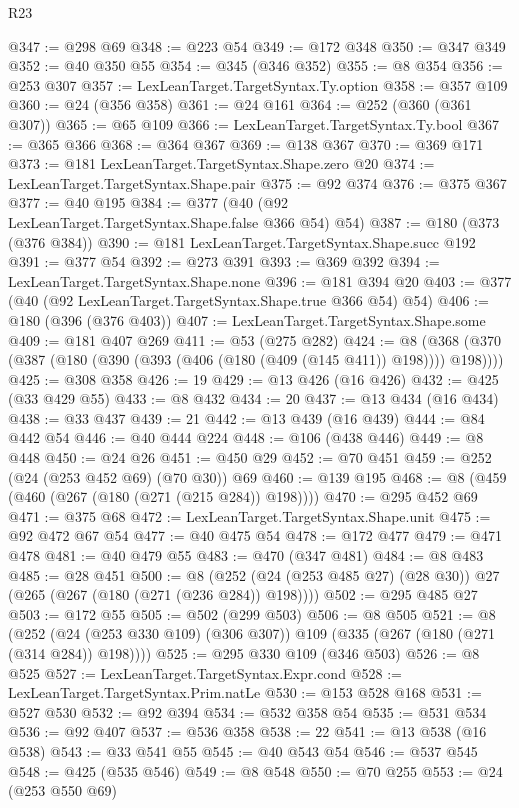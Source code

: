 \begin{lexlean}{R23}
\begin{coremodule}
{{{{{{{{{{{{{{{{{{{{{{{{{{{{{{{{{{{{{{{{{{{{{{{@347 := @298 @69
@348 := @223 @54
@349 := @172 @348
@350 := @347 @349
@352 := @40 @350 @55
@354 := @345 (@346 @352)
@355 := @8 @354
@356 := @253 @307
@357 := LexLeanTarget.TargetSyntax.Ty.option
@358 := @357 @109
@360 := @24 (@356 @358)
@361 := @24 @161
@364 := @252 (@360 (@361 @307))
@365 := @65 @109
@366 := LexLeanTarget.TargetSyntax.Ty.bool
@367 := @365 @366
@368 := @364 @367
@369 := @138 @367
@370 := @369 @171
@373 := @181 LexLeanTarget.TargetSyntax.Shape.zero @20
@374 := LexLeanTarget.TargetSyntax.Shape.pair
@375 := @92 @374
@376 := @375 @367
@377 := @40 @195
@384 := @377 (@40 (@92 LexLeanTarget.TargetSyntax.Shape.false @366 @54) @54)
@387 := @180 (@373 (@376 @384))
@390 := @181 LexLeanTarget.TargetSyntax.Shape.succ @192
@391 := @377 @54
@392 := @273 @391
@393 := @369 @392
@394 := LexLeanTarget.TargetSyntax.Shape.none
@396 := @181 @394 @20
@403 := @377 (@40 (@92 LexLeanTarget.TargetSyntax.Shape.true @366 @54) @54)
@406 := @180 (@396 (@376 @403))
@407 := LexLeanTarget.TargetSyntax.Shape.some
@409 := @181 @407 @269
@411 := @53 (@275 @282)
@424 := @8 (@368 (@370 (@387 (@180 (@390 (@393 (@406 (@180 (@409 (@145 @411)) @198)))) @198))))
@425 := @308 @358
@426 := 19
@429 := @13 @426 (@16 @426)
@432 := @425 (@33 @429 @55)
@433 := @8 @432
@434 := 20
@437 := @13 @434 (@16 @434)
@438 := @33 @437
@439 := 21
@442 := @13 @439 (@16 @439)
@444 := @84 @442 @54
@446 := @40 @444 @224
@448 := @106 (@438 @446)
@449 := @8 @448
@450 := @24 @26
@451 := @450 @29
@452 := @70 @451
@459 := @252 (@24 (@253 @452 @69) (@70 @30)) @69
@460 := @139 @195
@468 := @8 (@459 (@460 (@267 (@180 (@271 (@215 @284)) @198))))
@470 := @295 @452 @69
@471 := @375 @68
@472 := LexLeanTarget.TargetSyntax.Shape.unit
@475 := @92 @472 @67 @54
@477 := @40 @475 @54
@478 := @172 @477
@479 := @471 @478
@481 := @40 @479 @55
@483 := @470 (@347 @481)
@484 := @8 @483
@485 := @28 @451
@500 := @8 (@252 (@24 (@253 @485 @27) (@28 @30)) @27 (@265 (@267 (@180 (@271 (@236 @284)) @198))))
@502 := @295 @485 @27
@503 := @172 @55
@505 := @502 (@299 @503)
@506 := @8 @505
@521 := @8
    (@252 (@24 (@253 @330 @109) (@306 @307)) @109 (@335 (@267 (@180 (@271 (@314 @284)) @198))))
@525 := @295 @330 @109 (@346 @503)
@526 := @8 @525
@527 := LexLeanTarget.TargetSyntax.Expr.cond
@528 := LexLeanTarget.TargetSyntax.Prim.natLe
@530 := @153 @528 @168
@531 := @527 @530
@532 := @92 @394
@534 := @532 @358 @54
@535 := @531 @534
@536 := @92 @407
@537 := @536 @358
@538 := 22
@541 := @13 @538 (@16 @538)
@543 := @33 @541 @55
@545 := @40 @543 @54
@546 := @537 @545
@548 := @425 (@535 @546)
@549 := @8 @548
@550 := @70 @255
@553 := @24 (@253 @550 @69)
}}}}}}}}}}}}}}}}}}}}}}}}}}}}}}}}}}}}}}}}}}}}}}}
\end{coremodule}
\end{lexlean}
